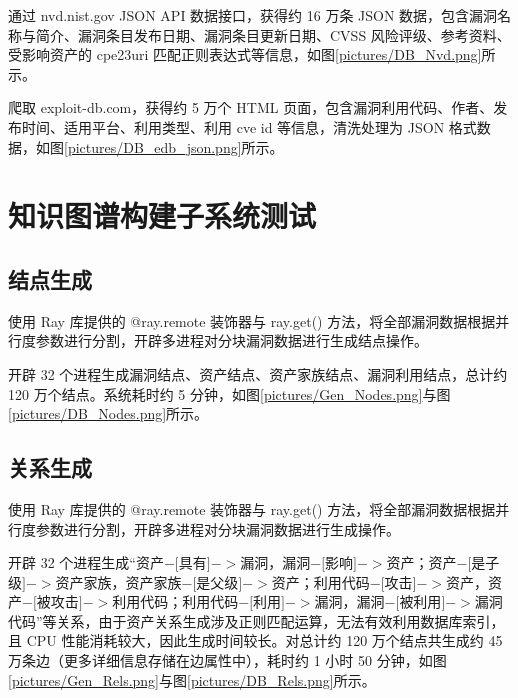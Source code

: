 \documentclass[a4paper,AutoFakeBold,oneside,12pt]{book}
\begin{document}

通过 nvd.nist.gov JSON API 数据接口，获得约 16 万条 JSON 数据，包含漏洞名称与简介、漏洞条目发布日期、漏洞条目更新日期、CVSS 风险评级、参考资料、受影响资产的 cpe23uri 匹配正则表达式等信息，如图\ref{pictures/DB_Nvd.png}所示。


爬取 exploit-db.com，获得约 5 万个 HTML 页面，包含漏洞利用代码、作者、发布时间、适用平台、利用类型、利用 cve id 等信息，清洗处理为 JSON 格式数据，如图\ref{pictures/DB_edb_json.png}所示。


\section{知识图谱构建子系统测试}

\subsection{结点生成}

使用 Ray 库提供的 @ray.remote 装饰器与 ray.get() 方法，将全部漏洞数据根据并行度参数进行分割，开辟多进程对分块漏洞数据进行生成结点操作。

开辟 32 个进程生成漏洞结点、资产结点、资产家族结点、漏洞利用结点，总计约 120 万个结点。系统耗时约 5 分钟，如图\ref{pictures/Gen_Nodes.png}与图\ref{pictures/DB_Nodes.png}所示。



\subsection{关系生成}

使用 Ray 库提供的 @ray.remote 装饰器与 ray.get() 方法，将全部漏洞数据根据并行度参数进行分割，开辟多进程对分块漏洞数据进行生成操作。

开辟 32 个进程生成“资产$-[$具有$]->$漏洞，漏洞$-[$影响$]->$资产；资产$-[$是子级$]->$资产家族，资产家族$-[$是父级$]->$资产；利用代码$-[$攻击$]->$资产，资产$-[$被攻击$]->$利用代码；利用代码$-[$利用$]->$漏洞，漏洞$-[$被利用$]->$漏洞代码”等关系，由于资产关系生成涉及正则匹配运算，无法有效利用数据库索引，且 CPU 性能消耗较大，因此生成时间较长。对总计约 120 万个结点共生成约 45 万条边（更多详细信息存储在边属性中），耗时约 1 小时 50 分钟，如图\ref{pictures/Gen_Rels.png}与图\ref{pictures/DB_Rels.png}所示。
\end{document}

